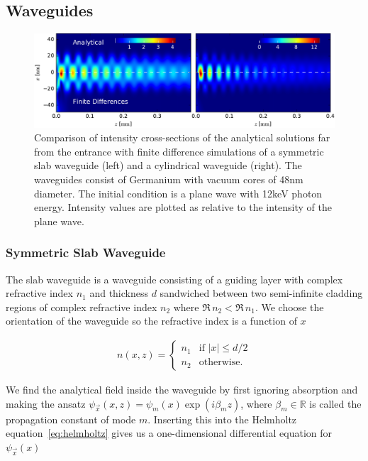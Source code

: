 
\subsection{Waveguides}

\begin{figure}[h!]
    \centering
    \includegraphics[width=1\textwidth]{analytical/analytical_waveguide}
    \caption{Comparison of intensity cross-sections of the analytical solutions far from the entrance with finite difference simulations of a symmetric slab waveguide (left) and a cylindrical waveguide (right). The waveguides consist of Germanium with vacuum cores of 48nm diameter. The initial condition is a plane wave with 12keV photon energy. Intensity values are plotted as relative to the intensity of the plane wave.}
    \label{fig:waveguide_fd_analytical_comparison}
\end{figure}


\subsubsection{Symmetric Slab Waveguide}

The slab waveguide is a waveguide consisting of a guiding layer with complex refractive index $n_1$ and thickness $d$ sandwiched between two semi-infinite cladding regions of complex refractive index $n_2$ where $\Re\, n_2 < \Re\, n_1$. We choose the orientation of the waveguide so the refractive index is a function of $x$ 

\begin{align*}
    n(x,z) = 
    \begin{cases}
    n_1 & \text{if } |x| \le d/2\\
    n_2 & \text{otherwise.}
    \end{cases}
\end{align*}

We find the analytical field inside the waveguide by first ignoring absorption and making the ansatz $\psi_{\vec x}(x,z) = \psi_m(x) \exp(i \beta_m z)$, where $\beta_m \in \mathbb{R}$ is called the propagation constant of mode $m$. Inserting this into the Helmholtz equation~\eqref{eq:helmholtz} gives us a one-dimensional differential equation for $\psi_{\vec x}(x)$

